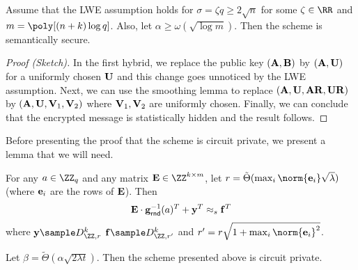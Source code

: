 \begin{lemma}
Assume that the LWE assumption holds for $\sigma=\zeta q \geq 2\sqrt{n}$ for some $\zeta\in\RR$ and $m=\poly[(n+k)\log q]$.  Also, let $\alpha\geq  \omega(\sqrt{ \log m})$. Then the scheme is semantically secure.%
 \end{lemma}
 \begin{proof}[Proof (Sketch)]
 In the first hybrid, we replace the public key $(\mathbf{A},\mathbf{B})$ by $(\mathbf{A},\mathbf{U})$  for a uniformly chosen $\mathbf{U}$ and this change goes unnoticed by the LWE assumption. Next, we can use the smoothing lemma \cite{STOC:Regev05,FOCS:MicReg04,STOC:GenPeiVai08} to replace $(\mathbf{A},\mathbf{U},\mathbf{A}\mathbf{R},\mathbf{U}\mathbf{R})$ by $(\mathbf{A},\mathbf{U},\mathbf{V}_1,\mathbf{V}_2)$ where $\mathbf{V}_1,\mathbf{V}_2$ are uniformly chosen. Finally, we can conclude that the encrypted message is statistically hidden and the result follows.
 \end{proof}


Before presenting the proof that the scheme is circuit private, we present a lemma that we will need.




\begin{lemma}
\label{lemma:smoothingErrorBDMW}
For any $a\in\ZZ_q$ and any matrix $\En\in\ZZ^{k\times m}$, let $r=\tilde \Theta(\max_i \norm{\en_i}\sqrt{\lambda})$ (where $\mathbf{e}_i$ are the rows of $\mathbf{E}$). Then $$\mathbf{E}\cdot\mathbf{g}^{-1}_\mathsf{rnd}(a)^T+\mathbf{y}^T\approx_s \mathbf{f}^T$$ where $\yn\sample D_{\ZZ,r}^k$ $\fn\sample D_{\ZZ,r'}^k$ and $r'=r\sqrt{1+\max_i \norm{\en_i}^2}$.
\end{lemma}



\begin{lemma}
Let $\beta=\tilde \Theta(\alpha\sqrt{2\lambda t})$. Then the scheme presented above is circuit private.%
\end{lemma}

